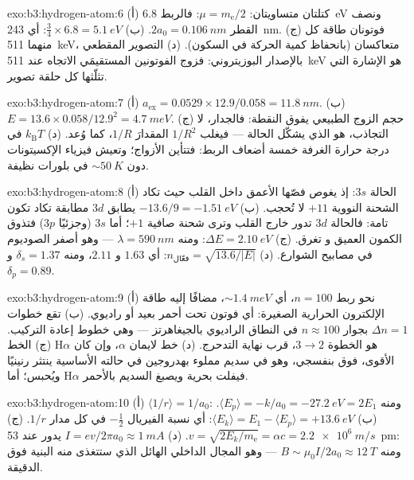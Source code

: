 \begin{solution}{exo:b3:hydrogen-atom:6}
(أ) كتلتان متساويتان: $\mu = m_{\text{e}}/2$: فالربط
\qty{6.8}{eV} ونصف القطر $2a_0 = \qty{0.106}{nm}$. (ب) $\tfrac34
\times 6.8 = \qty{5.1}{eV}$: أي \qty{243}{nm}. (ج) فوتونان طاقة كل منهما
\qty{511}{keV}، متعاكسان (بانحفاظ كمية الحركة في السكون). (د)
التصوير المقطعي بالإصدار البوزيتروني: فزوج الفوتونين المستقيمَي
الاتجاه عند \qty{511}{keV} هو الإشارة التي تثلّثها كل حلقة تصوير.
\end{solution}

\begin{solution}{exo:b3:hydrogen-atom:7}
(أ) $a_{\text{ex}} = 0.0529 \times 12.9/0.058 = \qty{11.8}{nm}$.
(ب) $E = 13.6 \times 0.058/12.9^2 = \qty{4.7}{meV}$. (ج) حجم
الزوج الطبيعي يفوق النقطة: فالجدار، لا التجاذب،
هو الذي يشكّل الحالة --- فيغلب $1/R^2$ المقدارَ $1/R$، كما وُعد. (د)
$k_{\text{B}}T$ في درجة حرارة الغرفة خمسة أضعاف الربط: فتتأين
الأزواج؛ وتعيش فيزياء الإكسيتونات دون $\sim\qty{50}{K}$ في
بلورات نظيفة.
\end{solution}

\begin{solution}{exo:b3:hydrogen-atom:8}
(أ) الحالة $3s$: إذ يغوص فصّها الأعمق داخل القلب حيث تكاد الشحنة
النووية $+11$ لا تُحجب. (ب) $-13.6/9 = \qty{-1.51}{eV}$
يطابق $3d$ مطابقة تكاد تكون تامة: فالحالة $3d$ تدور خارج القلب وترى
شحنة صافية $+1$؛ أما $3s$ (وجزئيًا $3p$) فتذوق الكمون العميق و
تغرق. (ج) $\Delta E = \qty{2.10}{eV}$: ومنه $\lambda = \qty{590}{nm}$
--- وهو أصفر الصوديوم في مصابيح الشوارع. (د) $n_{\text{فعّال}} =
\sqrt{13.6/|E|}$: أي $1.63$ و $2.11$، ومنه $\delta_s = 1.37$ و
$\delta_p = 0.89$.
\end{solution}

\begin{solution}{exo:b3:hydrogen-atom:9}
(أ) نحو ربط $n = 100$، أي $\sim\qty{1.4}{meV}$، مضافًا إليه
طاقة الإلكترون الحرارية الصغيرة: أي فوتون تحت أحمر بعيد أو راديوي. (ب)
تقع خطوات $\Delta n = 1$ بجوار $n \approx 100$ في النطاق الراديوي
بالجيغاهرتز --- وهي خطوط إعادة التركيب. (ج) الخط H$\alpha$ هو الخطوة $3 \to
2$، قرب نهاية التدحرج. (د) خط لايمان $\alpha$، وإن كان الأقوى،
فوق بنفسجي، وهو في سديم مملوء بهدروجين في حالته الأساسية
ينتثر رنينيًا ويُحبس؛ أما H$\alpha$ فيفلت بحرية
ويصبغ السديم بالأحمر.
\end{solution}

\begin{solution}{exo:b3:hydrogen-atom:10}
(أ) $\langle 1/r\rangle = 1/a_0$: ومنه $\langle E_p\rangle = -k/a_0 =
\qty{-27.2}{eV} = 2E_1$. (ب) $\langle E_k\rangle = E_1 - \langle
E_p\rangle = +\qty{13.6}{eV}$: أي نسبة الفيريال $-\tfrac12$ في
كل مدار $1/r$. (ج) $v = \sqrt{2E_k/m_{\text{e}}} = \alpha c =
\qty{2.2e6}{m/s}$. (د) $I = ev/2\pi a_0 \approx \qty{1}{mA}$
يدور عند \qty{53}{pm}: ومنه $B \sim \mu_0I/2a_0 \approx
\qty{12}{T}$ --- وهو المجال الداخلي الهائل الذي ستتغذى منه
البنية فوق الدقيقة.
\end{solution}

